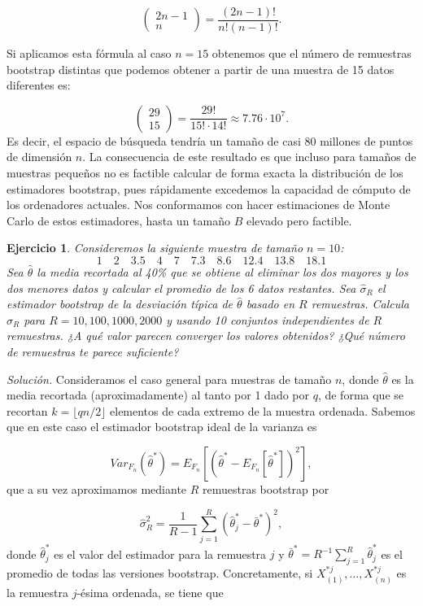 \documentclass[12pt]{article}
\newtheorem{ejer}{Ejercicio}%
\begin{document}
\[
\begin{pmatrix}
  2n -1\\
  n
\end{pmatrix} = \frac{(2n-1)!}{n!(n-1)!}.
\]

Si aplicamos esta fórmula al caso $n=15$ obtenemos que el número de remuestras bootstrap distintas que podemos obtener a partir de una muestra de 15 datos diferentes es:

\[
\begin{pmatrix}
  29\\
  15
\end{pmatrix} = \frac{29!}{15!\cdot 14!} \approx 7.76 \cdot 10^{7}.
\]
Es decir, el espacio de búsqueda tendría un tamaño de casi 80 millones de puntos de dimensión $n$. La consecuencia de este resultado es que incluso para tamaños de muestras pequeños no es factible calcular de forma exacta la distribución de los estimadores bootstrap, pues rápidamente excedemos la capacidad de cómputo de los ordenadores actuales. Nos conformamos con hacer estimaciones de Monte Carlo de estos estimadores, hasta un tamaño $B$ elevado pero factible.


\begin{ejer}
Consideremos la siguiente muestra de tamaño $n=10$:
\[
1 \quad 2 \quad 3.5 \quad 4 \quad 7 \quad 7.3 \quad 8.6 \quad 12.4 \quad 13.8 \quad 18.1
\]
Sea $\hat\theta$ la media recortada al 40\% que se obtiene al eliminar los dos mayores y los dos menores datos y calcular el promedio de los 6 datos restantes. Sea $\hat\sigma_R$ el estimador bootstrap de la desviación típica de $\hat\theta$ basado en $R$ remuestras. Calcula $\hat\sigma_R$ para $R=10,100,1000,2000$ y usando 10 conjuntos independientes de $R$ remuestras. ¿A qué valor parecen converger los valores obtenidos? ¿Qué número de remuestras te parece suficiente?
\end{ejer}

\textit{Solución.} Consideramos el caso general para muestras de tamaño $n$, donde $\hat\theta$ es la media recortada (aproximadamente) al tanto por 1 dado por $q$, de forma que se recortan $k = \lfloor qn/2 \rfloor$ elementos de cada extremo de la muestra ordenada. Sabemos que en este caso el estimador bootstrap ideal de la varianza es

\[
Var_{F_n}(\hat\theta^*)=E_{F_n}\left[\left(\hat\theta^{*}-E_{F_n}[\hat\theta^*]\right)^2\right],
\]
que a su vez aproximamos mediante $R$ remuestras bootstrap por

\begin{equation}
  \label{eq:bootstrap}
\hat\sigma_R^2 = \frac{1}{R-1}\sum_{j=1}^R \left(\hat\theta_j^{*}- \bar\theta^*\right)^2,
\end{equation}
donde $\hat\theta^*_j$ es el valor del estimador para la remuestra $j$ y $\bar\theta^*=R^{-1}\sum_{j=1}^R \hat\theta^*_j$ es el promedio de todas las versiones bootstrap. Concretamente, si $X_{(1)}^{*j}, \dots, X_{(n)}^{*j}$ es la remuestra $j$-ésima ordenada, se tiene que
\end{document}
